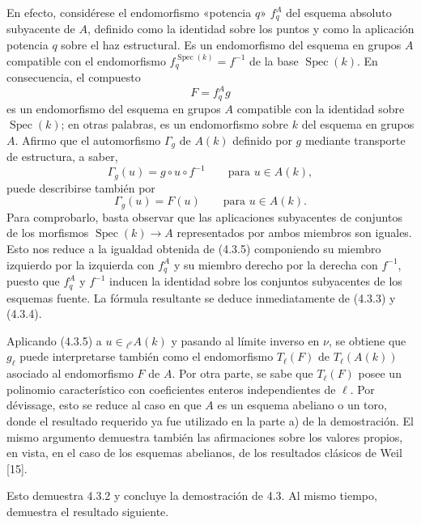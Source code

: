 En efecto, considérese el endomorfismo «potencia $q$» $f_q^A$ del
esquema absoluto subyacente de $A$, definido como la identidad sobre
los puntos y como la aplicación potencia $q$ sobre el haz estructural.
Es un endomorfismo del esquema en grupos $A$ compatible con el
endomorfismo $f_q^{\operatorname{Spec}(k)}=f^{-1}$ de la base
$\operatorname{Spec}(k)$. En consecuencia, el compuesto
\begin{equation}\tag{4.3.3}
 F=f_q^A g
\end{equation}
es un endomorfismo del esquema en grupos $A$ compatible con la identidad
sobre $\operatorname{Spec}(k)$; en otras palabras, es un endomorfismo
sobre $k$ del esquema en grupos $A$. Afirmo que el automorfismo
$\Gamma_g$ de $A(k)$ definido por $g$ mediante transporte de estructura,
a saber,
\begin{equation}\tag{4.3.4}
 \Gamma_g(u)=g\circ u\circ f^{-1}
 \qquad\text{para }u\in A(k),
\end{equation}
puede describirse también por
\begin{equation}\tag{4.3.5}
 \Gamma_g(u)=F(u)
 \qquad\text{para }u\in A(k).
\end{equation}
Para comprobarlo, basta observar que las aplicaciones subyacentes de
conjuntos de los morfismos $\operatorname{Spec}(k)\longrightarrow A$
representados por ambos miembros son iguales. Esto nos reduce a la
igualdad obtenida de (4.3.5) componiendo su miembro izquierdo por la
izquierda con $f_q^A$ y su miembro derecho por la derecha con $f^{-1}$,
puesto que $f_q^A$ y $f^{-1}$ inducen la identidad sobre los conjuntos
subyacentes de los esquemas fuente. La fórmula resultante se deduce
inmediatamente de (4.3.3) y (4.3.4).

Aplicando (4.3.5) a $u\in{}_{\ell^\nu}A(k)$ y pasando al límite inverso
en $\nu$, se obtiene que $g_\ell$ puede interpretarse también como el
endomorfismo $T_\ell(F)$ de $T_\ell(A(k))$ asociado al endomorfismo $F$
de $A$. Por otra parte, se sabe que $T_\ell(F)$ posee un polinomio
característico con coeficientes enteros independientes de $\ell$. Por
dévissage, esto se reduce al caso en que $A$ es un esquema abeliano o
un toro, donde el resultado requerido ya fue utilizado en la parte a)
de la demostración. El mismo argumento demuestra también las
afirmaciones sobre los valores propios, en vista, en el caso de los
esquemas abelianos, de los resultados clásicos de Weil [15].

Esto demuestra 4.3.2 y concluye la demostración de 4.3. Al mismo tiempo,
demuestra el resultado siguiente.

